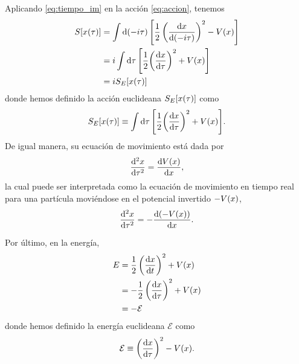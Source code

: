Aplicando \eqref{eq:tiempo_im} en la acción \eqref{eq:accion}, tenemos
\begin{align}
S\qty[x\qty(\tau)] &= \int \dd{\qty(-i\tau)} \qty[ \frac{1}{2} \left(\dv{x}{\qty(-i\tau)}\right)^2 - V(x)] \\
&= i \int \dd{\tau} \qty[ \frac{1}{2}\qty(\dv{x}{\tau})^2 + V(x)] \\
&= iS_E\qty[x\qty(\tau)] \label{eq:S_s_e}
\end{align}
donde hemos definido la acción euclideana $S_E\qty[x\qty(\tau)]$ como 
\begin{equation}\label{eq:eucliaction}
S_E\qty[x\qty(\tau)] \equiv \int \dd{\tau} \qty[ \frac{1}{2}\qty(\dv{x}{\tau})^2 + V(x)].
\end{equation}
De igual manera, su ecuación de movimiento está dada por
\begin{equation}\label{eq:mov_ec}
\dv[2]{x}{\tau} = \dv{V(x)}{x},
\end{equation}
la cual puede ser interpretada como la ecuación de movimiento en tiempo real para una partícula moviéndose en el potencial invertido $-V\qty(x)$,
\begin{equation}
\dv[2]{x}{\tau} = -\dv{\qty(-V(x))}{x}.
\end{equation}
 
Por último, en la energía, 
\begin{align}
	E &= \frac{1}{2} \left(\dv{x}{t}\right)^2 + V\qty(x) \\
	&= -\frac{1}{2} \left(\dv{x}{\tau}\right)^2 + V\qty(x) \\
	&= -\mathcal{E}
\end{align}
donde hemos definido la energía euclideana $\mathcal{E}$ como \cite{rubakov2009classical}
\begin{equation} \label{eq:E_eucli}
	\mathcal{E}  \equiv \left(\dv{x}{\tau}\right)^2 - V\qty(x).
\end{equation}

